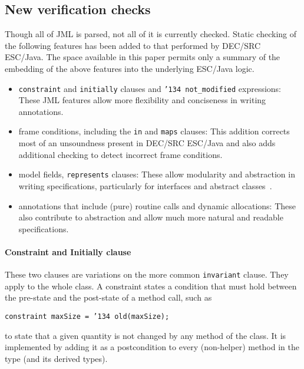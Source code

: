 \documentclass{sig-alternate}
\begin{document}

\subsection{New verification checks}
Though all of JML is parsed, not all of it is currently checked.
Static checking of the following features has been added to that performed by
DEC/SRC ESC/Java.  The space available in this paper permits only a
summary of the embedding of the above features into the underlying
ESC/Java logic.
\setlength{\partopsep}{0in}\setlength{\parskip}{0in}\setlength{\itemsep}{0in}\setlength{\topsep}{0in}
\begin{itemize}
\setlength{\partopsep}{0in}\setlength{\parskip}{0in}\setlength{\itemsep}{0in}\setlength{\topsep}{0in}
\item \texttt{constraint} and \texttt{initially} clauses and \texttt{\char'134 not\_modified} expressions: These JML features allow more flexibility and conciseness in writing annotations.
\item frame conditions, including the \texttt{in} and \texttt{maps} clauses:  This addition corrects
most of an unsoundness present in DEC/SRC ESC/Java and also adds additional checking to detect
incorrect frame conditions.
\item model fields, \texttt{represents} clauses: These allow modularity and abstraction in
writing specifications, particularly for interfaces and abstract classes~\cite{Cheon-etal03}.
\item annotations that include (pure) routine calls and dynamic allocations: These also contribute
to abstraction and allow much more natural and readable specifications.
\end{itemize}

\paragraph*{Constraint and Initially clause}
These two clauses are variations on the more common \texttt{invariant} clause.  They apply to the whole class.  A constraint states a condition that must hold between the pre-state and the post-state of a method call, such as
\begin{center}
\texttt{constraint maxSize = \char'134 old(maxSize); }
\end{center}
to state that a given quantity is not changed by any method of the class.  It is implemented by 
adding it as a postcondition to every (non-helper) method in the type (and its derived types).
\end{document}
